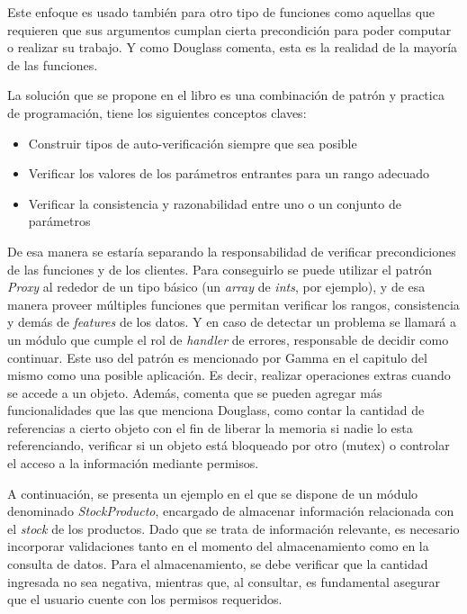 Este enfoque es usado también para otro tipo de funciones como aquellas que requieren que sus argumentos cumplan cierta precondición para poder computar o realizar su trabajo. Y como Douglass comenta, esta es la realidad de la mayoría de las funciones.

La solución que se propone en el libro es una combinación de patrón y practica de programación, tiene los siguientes conceptos claves:

\begin{itemize}
    \item Construir tipos de auto-verificación siempre que sea posible
    \item Verificar los valores de los parámetros entrantes para un rango adecuado
    \item Verificar la consistencia y razonabilidad entre uno o un conjunto de parámetros
\end{itemize}

De esa manera se estaría separando la responsabilidad de verificar precondiciones de las funciones y de los clientes. Para conseguirlo se puede utilizar el patrón \textit{Proxy} al rededor de un tipo básico (un \textit{array} de \textit{ints}, por ejemplo), y de esa manera proveer múltiples funciones que permitan verificar los rangos, consistencia y demás de \textit{features} de los datos. Y en caso de detectar un problema se llamará a un módulo que cumple el rol de \textit{handler} de errores, responsable de decidir como continuar. Este uso del patrón es mencionado por Gamma en el capitulo del mismo como una posible aplicación. Es decir, realizar operaciones extras cuando se accede a un objeto. Además, comenta que se pueden agregar más funcionalidades que las que menciona Douglass, como contar la cantidad de referencias a cierto objeto con el fin de liberar la memoria si nadie lo esta referenciando, verificar si un objeto está bloqueado por otro (mutex) o controlar el acceso a la información mediante permisos.

A continuación, se presenta un ejemplo en el que se dispone de un módulo denominado \textit{StockProducto}, encargado de almacenar información relacionada con el \textit{stock} de los productos. Dado que se trata de información relevante, es necesario incorporar validaciones tanto en el momento del almacenamiento como en la consulta de datos. Para el almacenamiento, se debe verificar que la cantidad ingresada no sea negativa, mientras que, al consultar, es fundamental asegurar que el usuario cuente con los permisos requeridos.

